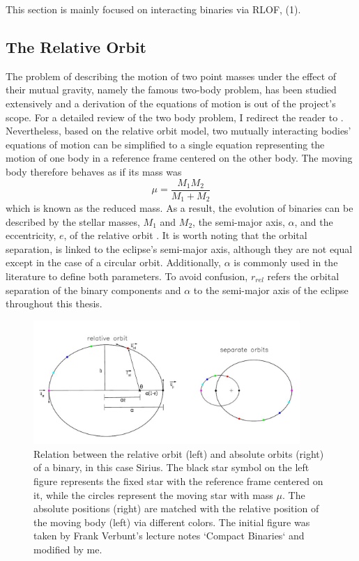 This section is mainly focused on interacting binaries via RLOF, (1). 

\subsection{The Relative Orbit}

The problem of describing the motion of two point masses
under the effect of their mutual gravity, namely the famous two-body problem, has been studied extensively and a derivation of the equations of motion is out of the project's scope. For a detailed review of the two body problem, I redirect the reader to  \cite{postnov2014evolution}. Nevertheless, based on the relative orbit model, two mutually interacting bodies' equations of motion can be simplified to a single equation representing the motion of one body in a reference frame centered on the other body. The moving body therefore behaves as if its mass was
\begin{equation}\label{eq:reduced_mass}
    \mu= \frac{M_1 M_2}{M_1 + M_2}
\end{equation}
which is known as the reduced mass. As a result, the evolution of binaries can be described by the stellar masses, $M_1$ and $M_2$, the semi-major axis, $\alpha$, and the eccentricity, $e$, of the relative orbit \citep{sana2012binary,postnov2014evolution,toonen2014popcorn}. It is worth noting that the orbital separation, is linked to the eclipse's semi-major axis, although they are not equal except in the case of a circular orbit. Additionally, $\alpha$ is commonly used in the literature to define both parameters. To avoid confusion, $r_{rel}$ refers the orbital separation of the binary components and $\alpha$ to the semi-major axis of the eclipse throughout this thesis.
\begin{figure}[H]
    \centering
    \includegraphics[width=0.9\textwidth]{Thesis/figures/relative_orbit.pdf}
    \caption{Relation between the relative orbit (left) and absolute orbits (right) of a
    binary, in this case Sirius. The black star symbol on the left figure represents the fixed star with the reference frame centered on it, while the circles represent the moving star with mass $\mu$. The absolute positions (right) are matched with the relative position of the moving body (left) via different colors.   The initial figure was taken by Frank Verbunt's lecture notes `Compact Binaries` and modified by me.}
    \label{fig:relative_orbit}
\end{figure}

